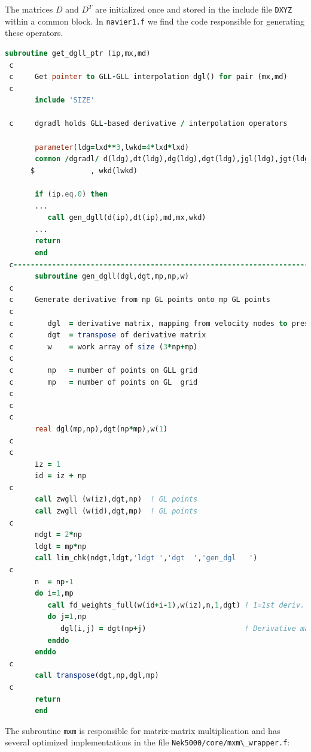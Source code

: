 \documentclass[
  a4paper,
  10pt]{article}
\newcommand{\passthrough}[1]{#1}
\begin{document}
The matrices \(D\) and \(D^T\) are initialized once and stored in the
include file \passthrough{\lstinline!DXYZ!} within a common block. In
\passthrough{\lstinline!navier1.f!} we find the code responsible for
generating these operators.

\begin{lstlisting}[language=Fortran]
       subroutine get_dgll_ptr (ip,mx,md)
 c
 c     Get pointer to GLL-GLL interpolation dgl() for pair (mx,md)
 c
       include 'SIZE'
 
 c     dgradl holds GLL-based derivative / interpolation operators
 
       parameter(ldg=lxd**3,lwkd=4*lxd*lxd)
       common /dgradl/ d(ldg),dt(ldg),dg(ldg),dgt(ldg),jgl(ldg),jgt(ldg)
      $             , wkd(lwkd)
       
       if (ip.eq.0) then
       ...
          call gen_dgll(d(ip),dt(ip),md,mx,wkd)
       ...
       return
       end
 c-----------------------------------------------------------------------
       subroutine gen_dgll(dgl,dgt,mp,np,w)
 c
 c     Generate derivative from np GL points onto mp GL points
 c
 c        dgl  = derivative matrix, mapping from velocity nodes to pressure
 c        dgt  = transpose of derivative matrix
 c        w    = work array of size (3*np+mp)
 c
 c        np   = number of points on GLL grid
 c        mp   = number of points on GL  grid
 c
 c
 c
       real dgl(mp,np),dgt(np*mp),w(1)
 c
 c
       iz = 1
       id = iz + np
 c
       call zwgll (w(iz),dgt,np)  ! GL points
       call zwgll (w(id),dgt,mp)  ! GL points
 c
       ndgt = 2*np
       ldgt = mp*np
       call lim_chk(ndgt,ldgt,'ldgt ','dgt  ','gen_dgl   ')
 c
       n  = np-1
       do i=1,mp
          call fd_weights_full(w(id+i-1),w(iz),n,1,dgt) ! 1=1st deriv.
          do j=1,np
             dgl(i,j) = dgt(np+j)                       ! Derivative matrix
          enddo
       enddo
 c
       call transpose(dgt,np,dgl,mp)
 c
       return
       end
\end{lstlisting}

The subroutine \passthrough{\lstinline!mxm!} is responsible for
matrix-matrix multiplication and has several optimized implementations
in the file \passthrough{\lstinline!Nek5000/core/mxm\_wrapper.f!}:
\end{document}
